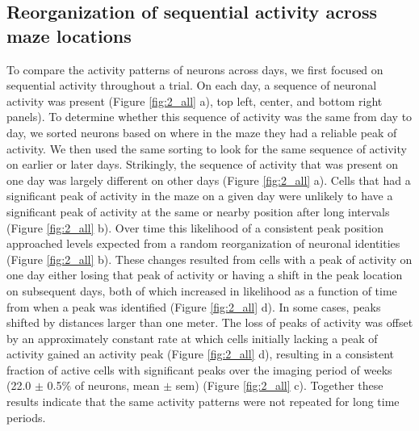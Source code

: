 \subsection{Reorganization of sequential activity across maze locations} \label{sec:chap3_peaks}
To compare the activity patterns of neurons across days, we first focused on sequential activity throughout a trial. On each day, a sequence of neuronal activity was present (Figure \ref{fig:2_all} a), top left, center, and bottom right panels). To determine whether this sequence of activity was the same from day to day, we sorted neurons based on where in the maze they had a reliable peak of activity. We then used the same sorting to look for the same sequence of activity on earlier or later days. Strikingly, the sequence of activity that was present on one day was largely different on other days (Figure \ref{fig:2_all} a). Cells that had a significant peak of activity in the maze on a given day were unlikely to have a significant peak of activity at the same or nearby position after long intervals (Figure \ref{fig:2_all} b). Over time this likelihood of a consistent peak position approached levels expected from a random reorganization of neuronal identities (Figure \ref{fig:2_all} b). These changes resulted from cells with a peak of activity on one day either losing that peak of activity or having a shift in the peak location on subsequent days, both of which increased in likelihood as a function of time from when a peak was identified (Figure \ref{fig:2_all} d). In some cases, peaks shifted by distances larger than one meter. The loss of peaks of activity was offset by an approximately constant rate at which cells initially lacking a peak of activity gained an activity peak (Figure \ref{fig:2_all} d), resulting in a consistent fraction of active cells with significant peaks over the imaging period of weeks (22.0 $\pm$ 0.5$\%$ of neurons, mean $\pm$ sem) (Figure \ref{fig:2_all} c). Together these results indicate that the same activity patterns were not repeated for long time periods.

